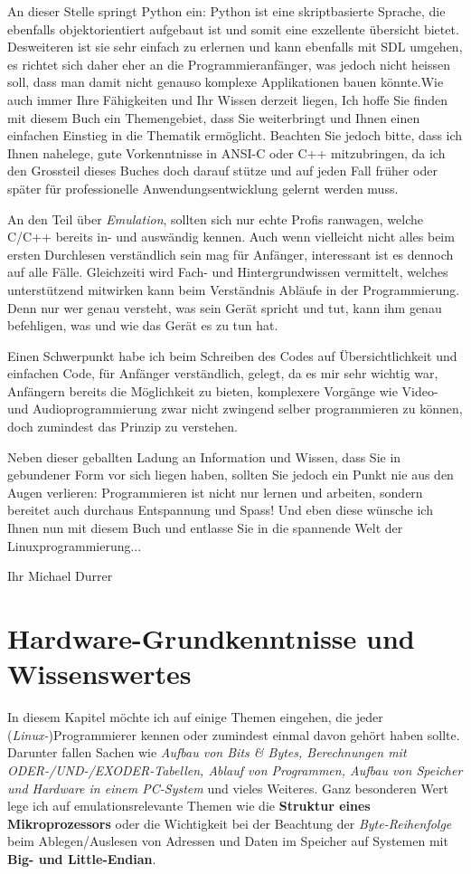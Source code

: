 \documentclass[a4paper,10pt,dvips,fleqn,titlepage,twoside]{book}
\begin{document}
An dieser Stelle springt Python ein: Python ist eine skriptbasierte Sprache, die ebenfalls objektorientiert aufgebaut ist und somit eine exzellente \"{u}bersicht bietet. Desweiteren ist sie sehr einfach zu erlernen und kann ebenfalls mit SDL umgehen, es richtet sich daher eher an die Programmieranf\"{a}nger, was jedoch nicht heissen soll, dass man damit nicht genauso komplexe Applikationen bauen k\"{o}nnte.\newline Wie auch immer Ihre F\"{a}higkeiten und Ihr Wissen derzeit liegen, Ich hoffe Sie finden mit diesem Buch ein Themengebiet, dass Sie weiterbringt und Ihnen einen einfachen Einstieg in die Thematik erm\"{o}glicht.
Beachten Sie jedoch bitte, dass ich Ihnen nahelege, gute Vorkenntnisse in ANSI-C oder C++ mitzubringen, da ich den Grossteil dieses Buches doch darauf st\"{u}tze und auf jeden Fall fr\"{u}her oder sp\"{a}ter f\"{u}r professionelle Anwendungsentwicklung gelernt werden muss.

An den Teil \"{u}ber \textit{Emulation}, sollten sich nur echte Profis ranwagen, welche C/C++ bereits in- und ausw\"{a}ndig kennen. Auch wenn vielleicht nicht alles beim ersten Durchlesen verst\"{a}ndlich sein mag f\"{u}r Anf\"{a}nger, interessant ist es dennoch auf alle Fälle. Gleichzeiti wird Fach- und Hintergrundwissen vermittelt, welches unterstützend mitwirken kann beim Verst\"{a}ndnis Abläufe in der Programmierung.
Denn nur wer genau versteht, was sein Gerät spricht und tut, kann ihm genau befehligen, was und wie das Gerät es zu tun hat.

Einen Schwerpunkt habe ich beim Schreiben des Codes auf Übersichtlichkeit und einfachen Code, für Anfänger verständlich, gelegt, da es mir sehr wichtig war, Anfängern bereits die Möglichkeit zu bieten, komplexere Vorgänge wie Video- und Audioprogrammierung zwar nicht zwingend selber programmieren zu können, doch zumindest das Prinzip zu verstehen.

Neben dieser geballten Ladung an Information und Wissen, dass Sie in gebundener Form vor sich liegen haben, sollten Sie jedoch ein Punkt nie aus den Augen verlieren: Programmieren ist nicht nur lernen und arbeiten, sondern bereitet auch durchaus Entspannung und Spass! Und eben diese w\"{u}nsche ich Ihnen nun mit diesem Buch und entlasse Sie in die spannende Welt der Linuxprogrammierung...


Ihr Michael Durrer
\newpage
\chapter{Hardware-Grundkenntnisse und Wissenswertes}
In diesem Kapitel möchte ich auf einige Themen eingehen, die jeder (\emph{Linux-})Programmierer kennen oder zumindest einmal davon gehört haben sollte. Darunter fallen Sachen wie \emph{Aufbau von Bits \& Bytes, Berechnungen mit ODER-/UND-/EXODER-Tabellen, Ablauf von Programmen, Aufbau von Speicher und Hardware in einem PC-System} und vieles Weiteres. Ganz besonderen Wert lege ich auf emulationsrelevante Themen wie die \textbf{Struktur eines Mikroprozessors} oder die Wichtigkeit bei der Beachtung der \emph{Byte-Reihenfolge} beim Ablegen/Auslesen von Adressen und Daten im Speicher auf Systemen mit \textbf{Big- und Little-Endian}.
\end{document}
